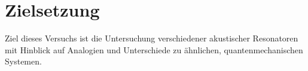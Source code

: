 \section{Zielsetzung}

Ziel dieses Versuchs ist die Untersuchung verschiedener akustischer Resonatoren mit Hinblick auf Analogien und Unterschiede zu ähnlichen, quantenmechanischen Systemen.
